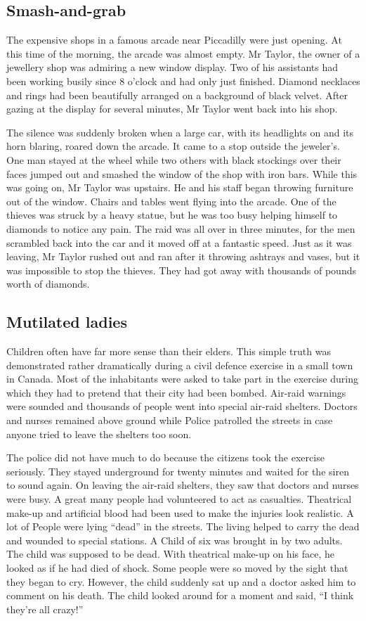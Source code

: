 \documentclass[11pt]{article}
\begin{document}
\subsection{Smash-and-grab}
\label{sec-1-6}

The expensive shops in a famous arcade near Piccadilly were just opening. At this time of the morning, the arcade was almost empty. Mr Taylor, the owner of a jewellery shop was admiring a new window display. Two of his assistants had been working busily since 8 o'clock and had only just finished. Diamond necklaces and rings had been beautifully arranged on a background of black velvet. After gazing at the display for several minutes, Mr Taylor went back into his shop.

The silence was suddenly broken when a large car, with its headlights on and its horn blaring, roared down the arcade. It came to a stop outside the jeweler's. One man stayed at the wheel while two others with black stockings over their faces jumped out and smashed the window of the shop with iron bars. While this was going on, Mr Taylor was upstairs. He and his staff began throwing furniture out of the window. Chairs and tables went flying into the arcade. One of the thieves was struck by a heavy statue, but he was too busy helping himself to diamonds to notice any pain. The raid was all over in three minutes, for the men scrambled back into the car and it moved off at a fantastic speed. Just as it was leaving, Mr Taylor rushed out and ran after it throwing ashtrays and vases, but it was impossible to stop the thieves. They had got away with thousands of pounds worth of diamonds.
\subsection{Mutilated ladies}
\label{sec-1-7}

Children often have far more sense than their elders. This simple truth was demonstrated rather dramatically during a civil defence exercise in a small town in Canada. Most of the inhabitants were asked to take part in the exercise during which they had to pretend that their city had been bombed. Air-raid warnings were sounded and thousands of people went into special air-raid shelters. Doctors and nurses remained above ground while Police patrolled the streets in case anyone tried to leave the shelters too soon.

The police did not have much to do because the citizens took the exercise seriously. They stayed underground for twenty minutes and waited for the siren to sound again. On leaving the air-raid shelters, they saw that doctors and nurses were busy. A great many people had volunteered to act as casualties. Theatrical make-up and artificial blood had been used to make the injuries look realistic. A lot of People were lying ``dead'' in the streets. The living helped to carry the dead and wounded to special stations. A Child of six was brought in by two adults. The child was supposed to be dead. With theatrical make-up on his face, he looked as if he had died of shock. Some people were so moved by the sight that they began to cry. However, the child suddenly sat up and a doctor asked him to comment on his death. The child looked around for a moment and said, ``I think they're all crazy!''
\end{document}
